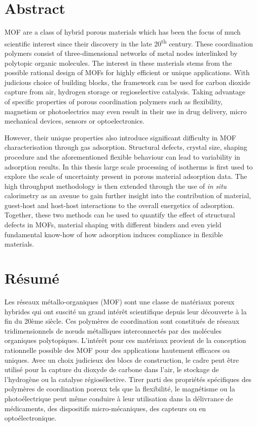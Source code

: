 
\chapter{Abstract}

\gls{MOF} are a class of hybrid porous materials
which has been the focus of much scientific interest since their
discovery in the late 20\textsuperscript{th} century. These
coordination polymers consist of three-dimensional networks of 
metal nodes interlinked by polytopic organic molecules. The 
interest in these materials stems from the possible rational design
of MOFs for highly efficient or unique applications. 
With judicious choice of building blocks, the framework can be used for
carbon dioxide capture from air, hydrogen storage or regioselective 
catalysis. Taking advantage of specific properties of porous 
coordination polymers such as flexibility, magnetism or photoelectrics
may even result in their use in drug delivery, micro mechanical devices,
sensors or optoelectronics.

However, their unique properties also introduce significant difficulty
in \gls{MOF} characterisation through gas adsorption. 
Structural defects, crystal size, shaping procedure
and the aforementioned flexible behaviour can lead to variability in
adsorption results. In this thesis large scale processing of 
isotherms is first used to explore the scale of uncertainty 
present in porous material adsorption data. The high throughput
methodology is then extended through the use of \textit{in situ} calorimetry
as an avenue to gain further insight into the contribution of material, 
guest-host and host-host interactions to the overall energetics of
adsorption. Together, these two methods can be used to quantify the effect
of structural defects in MOFs, material shaping with different binders 
and even yield fundamental know-how of how adsorption induces compliance
in flexible materials.

\pagebreak

\chapter{Résumé}

Les réseaux métallo-organiques (MOF) sont une classe de matériaux poreux hybrides qui ont suscité un grand intérêt scientifique depuis leur découverte à la fin du 20ème siècle. Ces polymères de coordination sont constitués de réseaux tridimensionnels de nœuds métalliques interconnectés par des molécules organiques polytopiques. L'intérêt pour ces matériaux provient de la conception rationnelle possible des MOF pour des applications hautement efficaces ou uniques. Avec un choix judicieux des blocs de construction, le cadre peut être utilisé pour la capture du dioxyde de carbone dans l'air, le stockage de l'hydrogène ou la catalyse régiosélective. Tirer parti des propriétés spécifiques des polymères de coordination poreux tels que la flexibilité, le magnétisme ou la photoélectrique peut même conduire à leur utilisation dans la délivrance de médicaments, des dispositifs micro-mécaniques, des capteurs ou en optoélectronique.

